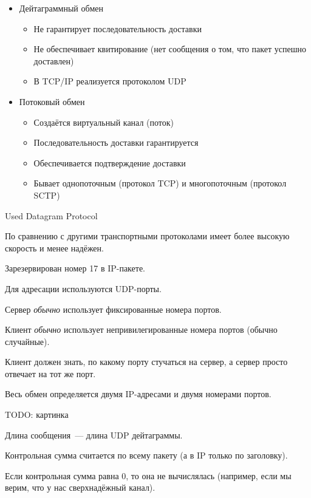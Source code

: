 
\begin{itemize}
    \item Дейтаграммный обмен
    \begin{itemize}
        \item Не гарантирует последовательность доставки
        \item Не обеспечивает квитирование (нет сообщения о том, что пакет успешно доставлен)
        \item В TCP/IP реализуется протоколом UDP
    \end{itemize}
    \item Потоковый обмен
    \begin{itemize}
        \item Создаётся виртуальный канал (поток)
        \item Последовательность доставки гарантируется
        \item Обеспечивается подтверждение доставки
        \item Бывает однопоточным (протокол TCP) и многопоточным (протокол SCTP)
    \end{itemize}
\end{itemize}


Used Datagram Protocol

По сравнению с другими транспортными протоколами имеет более высокую скорость и менее надёжен.

Зарезервирован номер 17 в IP-пакете. 

Для адресации используются UDP-порты.

Сервер {\it обычно} использует фиксированные номера портов.

Клиент {\it обычно} использует непривилегированные номера портов (обычно случайные).

Клиент должен знать, по какому порту стучаться на сервер, а сервер просто отвечает на тот же порт.

Весь обмен определяется двумя IP-адресами и двумя номерами портов.


TODO: картинка

Длина сообщения~--- длина UDP дейтаграммы.

Контрольная сумма считается по всему пакету (а в IP только по заголовку).

Если контрольная сумма равна 0, то она не вычислялась (например, если мы верим, что у нас сверхнадёжный канал).

